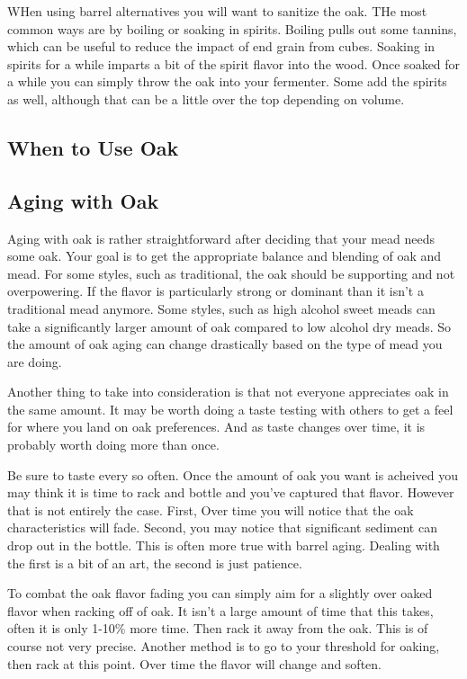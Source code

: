   WHen using barrel alternatives you will want to sanitize the oak. THe most common ways are by boiling 
  or soaking in spirits. Boiling pulls out some tannins, which can be useful to reduce the impact of 
  end grain from cubes. Soaking in spirits for a while imparts a bit of the spirit flavor into the wood. Once
  soaked for a while you can simply throw the oak into your fermenter. Some add the spirits as well, although
  that can be a little over the top depending on volume.

 \subsection{When to Use Oak}


 \subsection{Aging with Oak}
  Aging with oak is rather straightforward after deciding that your mead needs some oak. Your goal is to get the
  appropriate balance and blending of oak and mead. For some styles, such as traditional, the oak should be supporting
  and not overpowering. If the flavor is particularly strong or dominant than it isn't a traditional mead anymore.
  Some styles, such as high alcohol sweet meads can take a significantly larger amount of oak compared to low alcohol
  dry meads. So the amount of oak aging can change drastically based on the type of mead you are doing. 

  Another thing to take into consideration is that not everyone appreciates oak in the same amount. It may be worth
  doing a taste testing with others to get a feel for where you land on oak preferences. And as taste changes
  over time, it is probably worth doing more than once.

  Be sure to taste every so often. Once the amount of oak you want is acheived you may think it is time to rack
  and bottle and you've captured that flavor. However that is not entirely the case. 
  First, Over time you will notice that the oak characteristics will fade. Second, you may notice that
  significant sediment can drop out in the bottle. This is often more true with barrel aging. Dealing with the first
  is a bit of an art, the second is just patience.

  To combat the oak flavor fading you can simply aim for a slightly over oaked flavor when racking off of oak. It
  isn't a large amount of time that this takes, often it is only 1-10\% more time. Then rack it away from the oak. 
  This is of course not very precise. Another method is to go to your threshold for oaking, then rack at this point.
  Over time the flavor will change and soften.

